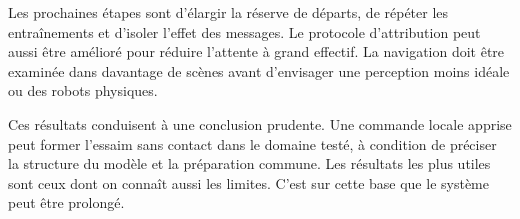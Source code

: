 Les prochaines étapes sont d'élargir la réserve de départs, de répéter les entraînements et d'isoler l'effet des messages. Le protocole d'attribution peut aussi être amélioré pour réduire l'attente à grand effectif. La navigation doit être examinée dans davantage de scènes avant d'envisager une perception moins idéale ou des robots physiques.

Ces résultats conduisent à une conclusion prudente. Une commande locale apprise peut former l'essaim sans contact dans le domaine testé, à condition de préciser la structure du modèle et la préparation commune. Les résultats les plus utiles sont ceux dont on connaît aussi les limites. C'est sur cette base que le système peut être prolongé.
